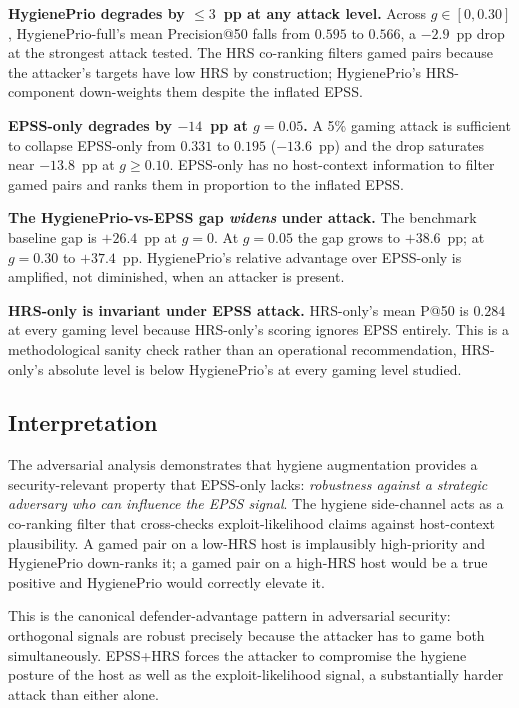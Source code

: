 \textbf{HygienePrio degrades by $\leq 3$~pp at any attack level.}
Across $g \in [0, 0.30]$, HygienePrio-full's mean Precision@50 falls
from $0.595$ to $0.566$, a $-2.9$~pp drop at the strongest attack
tested. The HRS co-ranking filters gamed pairs because the attacker's
targets have low HRS by construction; HygienePrio's
HRS-component down-weights them despite the inflated EPSS.

\textbf{EPSS-only degrades by $-14$~pp at $g = 0.05$.} A 5\% gaming
attack is sufficient to collapse EPSS-only from $0.331$ to $0.195$
($-13.6$~pp) and the drop saturates near $-13.8$~pp at $g \geq 0.10$.
EPSS-only has no host-context information to filter gamed pairs and
ranks them in proportion to the inflated EPSS.

\textbf{The HygienePrio-vs-EPSS gap \emph{widens} under attack.}
The benchmark baseline gap is $+26.4$~pp at $g = 0$.
At $g = 0.05$ the gap grows to $+38.6$~pp; at $g = 0.30$ to $+37.4$~pp.
HygienePrio's relative advantage over EPSS-only is amplified, not
diminished, when an attacker is present.

\textbf{HRS-only is invariant under EPSS attack.} HRS-only's mean
P@50 is $0.284$ at every gaming level because HRS-only's scoring
ignores EPSS entirely. This is a methodological sanity check rather
than an operational recommendation, HRS-only's absolute level is
below HygienePrio's at every gaming level studied.

\subsection{Interpretation}

The adversarial analysis demonstrates that hygiene augmentation
provides a security-relevant property that EPSS-only lacks:
\emph{robustness against a strategic adversary who can influence the
EPSS signal}. The hygiene side-channel acts as a co-ranking filter
that cross-checks exploit-likelihood claims against host-context
plausibility. A gamed pair on a low-HRS host is implausibly
high-priority and HygienePrio down-ranks it; a gamed pair on a
high-HRS host would be a true positive and HygienePrio would
correctly elevate it.

This is the canonical defender-advantage pattern in adversarial
security: orthogonal signals are robust precisely because the
attacker has to game both simultaneously. EPSS+HRS forces the
attacker to compromise the hygiene posture of the host as well as the
exploit-likelihood signal, a substantially harder attack than
either alone.

